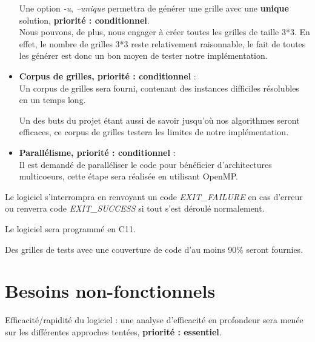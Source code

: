 \documentclass[1]{report}
\begin{document}
\begin{itemize}
            Une option \emph{-u}, \emph{--unique} permettra de générer une grille avec une \textbf{unique} solution, \textbf{priorité : conditionnel}. \\

            Nous pouvons, de plus, nous engager à créer toutes les grilles de taille 3*3. En effet, le nombre de grilles 3*3 reste relativement raisonnable, le fait de toutes les générer est donc un bon moyen de tester notre implémentation. \\




			\item \textbf{Corpus de grilles, priorité : conditionnel} : \\

		\quad	Un corpus de grilles sera fourni, contenant des instances difficiles résolubles en un temps long.

			Un des buts du projet étant aussi de savoir jusqu'où nos algorithmes seront efficaces, ce corpus de grilles testera les limites de notre implémentation. \\



			\item \textbf{Parallélisme, priorité : conditionnel} : \\

		\quad	Il est demandé de paralléliser le code pour bénéficier d'architectures multicoeurs, cette étape sera réalisée en utilisant OpenMP.
\\


        \end{itemize}

        Le logiciel s'interrompra en renvoyant un code \emph{EXIT\_FAILURE} en cas d'erreur ou renverra code \emph{EXIT\_SUCCESS} si tout s'est déroulé normalement.

        Le logiciel sera programmé en C11.

        Des grilles de tests avec une couverture de code d'au moins 90\% seront fournies. \\

    \section{Besoins non-fonctionnels}

        Efficacité/rapidité du logiciel : une analyse d'efficacité en profondeur sera menée sur les différentes approches tentées, \textbf{priorité : essentiel}.
\end{document}
